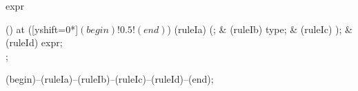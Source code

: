 \begin{syntax}{expr}
  
  \node[sequence] () at ([yshift=0*\syntaxruledist]$(begin)!0.5!(end)$) {
    \node[terminal]    (ruleIa) {(};
    &
    \node[nonterminal] (ruleIb) {type};
    &
    \node[terminal]    (ruleIc) {)};
    &
    \node[nonterminal] (ruleId) {expr};
    \\
  };
  
  \draw[path] (begin)--(ruleIa)--(ruleIb)--(ruleIc)--(ruleId)--(end);
\end{syntax}
